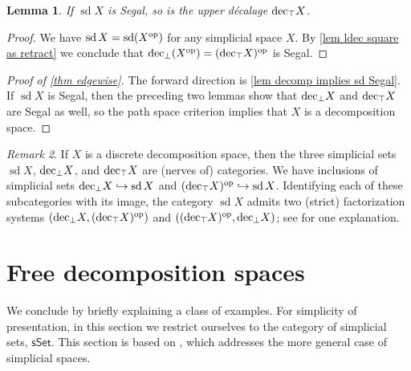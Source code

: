 \documentclass{amsart}
\newtheorem{theorem}{Theorem}[section]
\newtheorem{lemma}[theorem]{Lemma}
\theoremstyle{definition}
\theoremstyle{remark}
\newtheorem{remark}[theorem]{Remark}
\newcommand{\sset}{\mathsf{sSet}}
\newcommand{\op}{\textup{op}}
\newcommand{\udec}{\textup{dec}_{\top}}
\newcommand{\ldec}{\textup{dec}_{\perp}}
\DeclareMathOperator{\sd}{sd}
\begin{document}
\begin{lemma}
If $\sd X$ is Segal, so is the upper d\'ecalage $\udec X$.
\end{lemma}
\begin{proof}
We have $\sd X = \sd (X^\op)$ for any simplicial space $X$. 
By \cref{lem ldec square as retract} we conclude that $\ldec(X^\op) = (\udec X)^\op$ is Segal.
\end{proof}

\begin{proof}[Proof of \cref{thm edgewise}]
The forward direction is \cref{lem decomp implies sd Segal}.
If $\sd X$ is Segal, then the preceding two lemmas show that $\ldec X$ and $\udec X$ are Segal as well, so the path space criterion implies that $X$ is a decomposition space.
\end{proof}


\begin{remark}\label{rmk sd vs dec}
If $X$ is a discrete decomposition space, then the three simplicial sets $\sd X$, $\ldec X$, and $\udec X$ are (nerves of) categories.
We have inclusions of simplicial sets $\ldec X \hookrightarrow \sd X$ and $(\udec X)^\op \hookrightarrow \sd X$.
Identifying each of these subcategories with its image, the category $\sd X$ admits two (strict) factorization systems $(\ldec X, (\udec X)^\op)$ and $((\udec X)^\op, \ldec X)$; see \cite{Hackney:OC2SS} for one explanation.%
\end{remark}



\section{Free decomposition spaces}\label{sec free}

We conclude by briefly explaining a class of examples.
For simplicity of presentation, in this section we restrict ourselves to the category of simplicial sets, $\sset$. 
This section is based on \cite{HackneyKock:FDS}, which addresses the more general case of simplicial spaces.
\end{document}
